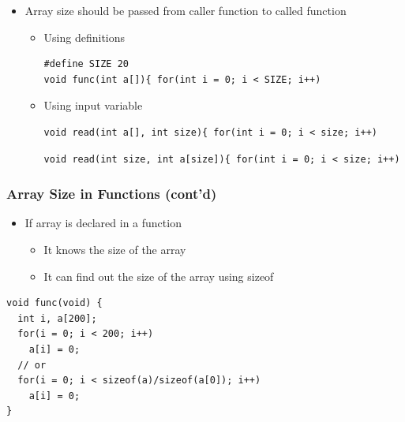 \documentclass{../c-lecture}
\begin{document}
\begin{frame}[fragile]
  \begin{itemize}
    \item
      Array size should be passed from caller function to called function

    \begin{itemize}
      \item Using definitions
      \begin{verbatim}
#define SIZE 20
void func(int a[]){ for(int i = 0; i < SIZE; i++)
      \end{verbatim}
      \item Using input variable
      \begin{verbatim}
void read(int a[], int size){ for(int i = 0; i < size; i++)
      \end{verbatim}
      \begin{verbatim}
void read(int size, int a[size]){ for(int i = 0; i < size; i++)
      \end{verbatim}
    \end{itemize}
  \end{itemize}
\end{frame}

\begin{frame}[fragile]
  \frametitle{Array Size in Functions (cont’d)}
  \begin{itemize}
    \item If array is declared in a function
    \begin{itemize}
      \item It knows the size of the array
      \item
        It {\color{Orange} can} find out the size of the array
        using {\color{LimeGreen} sizeof}
    \end{itemize}
  \end{itemize}
  \begin{verbatim}
void func(void) {
  int i, a[200];
  for(i = 0; i < 200; i++)
    a[i] = 0;
  // or
  for(i = 0; i < sizeof(a)/sizeof(a[0]); i++)
    a[i] = 0;
}
  \end{verbatim}
\end{frame}
\end{document}

